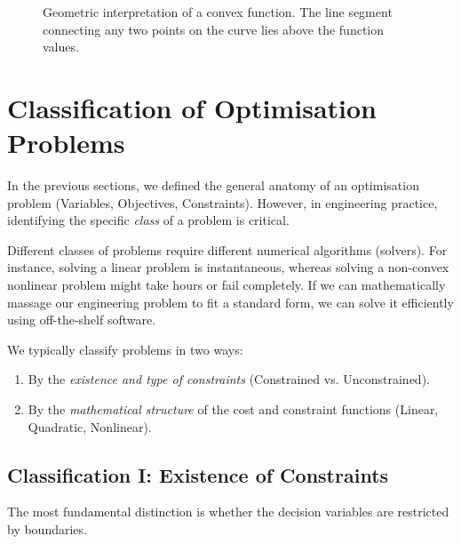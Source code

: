 \begin{figure}[h]
	\caption{Geometric interpretation of a convex function. The line segment connecting any two points on the curve lies above the function values.}
	\label{fig:convex_func}
\end{figure}



\section{Classification of Optimisation Problems}

In the previous sections, we defined the general anatomy of an optimisation problem (Variables, Objectives, Constraints). However, in engineering practice, identifying the specific \textit{class} of a problem is critical.

Different classes of problems require different numerical algorithms (solvers). For instance, solving a linear problem is instantaneous, whereas solving a non-convex nonlinear problem might take hours or fail completely. If we can mathematically massage our engineering problem to fit a standard form, we can solve it efficiently using off-the-shelf software.

We typically classify problems in two ways:
\begin{enumerate}
	\item By the \emph{existence and type of constraints} (Constrained vs. Unconstrained).
	\item By the \emph{mathematical structure} of the cost and constraint functions (Linear, Quadratic, Nonlinear).
\end{enumerate}

\subsection{Classification I: Existence of Constraints}

The most fundamental distinction is whether the decision variables are restricted by boundaries.

